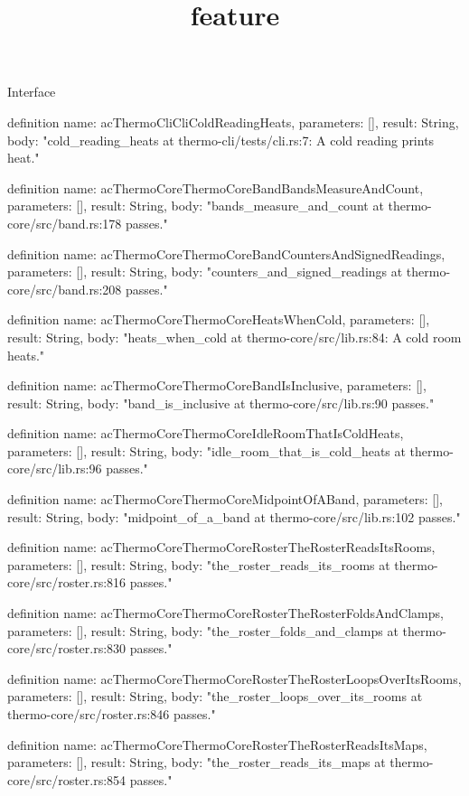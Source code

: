\begin{lexlean}{Interface}
\title{feature}
\begin{semanticmodule}
definition{
  name: acThermoCliCliColdReadingHeats,
  parameters: [],
  result: String,
  body: "cold_reading_heats at thermo-cli/tests/cli.rs:7: A cold reading prints heat."
}

definition{
  name: acThermoCoreThermoCoreBandBandsMeasureAndCount,
  parameters: [],
  result: String,
  body: "bands_measure_and_count at thermo-core/src/band.rs:178 passes."
}

definition{
  name: acThermoCoreThermoCoreBandCountersAndSignedReadings,
  parameters: [],
  result: String,
  body: "counters_and_signed_readings at thermo-core/src/band.rs:208 passes."
}

definition{
  name: acThermoCoreThermoCoreHeatsWhenCold,
  parameters: [],
  result: String,
  body: "heats_when_cold at thermo-core/src/lib.rs:84: A cold room heats."
}

definition{
  name: acThermoCoreThermoCoreBandIsInclusive,
  parameters: [],
  result: String,
  body: "band_is_inclusive at thermo-core/src/lib.rs:90 passes."
}

definition{
  name: acThermoCoreThermoCoreIdleRoomThatIsColdHeats,
  parameters: [],
  result: String,
  body: "idle_room_that_is_cold_heats at thermo-core/src/lib.rs:96 passes."
}

definition{
  name: acThermoCoreThermoCoreMidpointOfABand,
  parameters: [],
  result: String,
  body: "midpoint_of_a_band at thermo-core/src/lib.rs:102 passes."
}

definition{
  name: acThermoCoreThermoCoreRosterTheRosterReadsItsRooms,
  parameters: [],
  result: String,
  body: "the_roster_reads_its_rooms at thermo-core/src/roster.rs:816 passes."
}

definition{
  name: acThermoCoreThermoCoreRosterTheRosterFoldsAndClamps,
  parameters: [],
  result: String,
  body: "the_roster_folds_and_clamps at thermo-core/src/roster.rs:830 passes."
}

definition{
  name: acThermoCoreThermoCoreRosterTheRosterLoopsOverItsRooms,
  parameters: [],
  result: String,
  body: "the_roster_loops_over_its_rooms at thermo-core/src/roster.rs:846 passes."
}

definition{
  name: acThermoCoreThermoCoreRosterTheRosterReadsItsMaps,
  parameters: [],
  result: String,
  body: "the_roster_reads_its_maps at thermo-core/src/roster.rs:854 passes."
}


\end{semanticmodule}
\end{lexlean}
